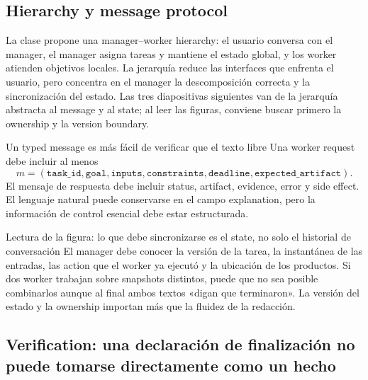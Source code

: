 \subsection{Hierarchy y message protocol}

La clase propone una manager--worker hierarchy: el usuario conversa con el manager, el manager asigna tareas y mantiene el estado global, y los worker atienden objetivos locales. La jerarquía reduce las interfaces que enfrenta el usuario, pero concentra en el manager la descomposición correcta y la sincronización del estado. Las tres diapositivas siguientes van de la jerarquía abstracta al message y al state; al leer las figuras, conviene buscar primero la ownership y la version boundary.



\begin{importantbox}{Un typed message es más fácil de verificar que el texto libre}
Una worker request debe incluir al menos
\[
m=(\texttt{task\_id},\texttt{goal},\texttt{inputs},\texttt{constraints},\texttt{deadline},\texttt{expected\_artifact}).
\]
El mensaje de respuesta debe incluir status, artifact, evidence, error y side effect. El lenguaje natural puede conservarse en el campo explanation, pero la información de control esencial debe estar estructurada.
\end{importantbox}


\begin{knowledgebox}{Lectura de la figura: lo que debe sincronizarse es el state, no solo el historial de conversación}
El manager debe conocer la versión de la tarea, la instantánea de las entradas, las action que el worker ya ejecutó y la ubicación de los productos. Si dos worker trabajan sobre snapshots distintos, puede que no sea posible combinarlos aunque al final ambos textos «digan que terminaron». La versión del estado y la ownership importan más que la fluidez de la redacción.
\end{knowledgebox}

\subsection{Verification: una declaración de finalización no puede tomarse directamente como un hecho}

